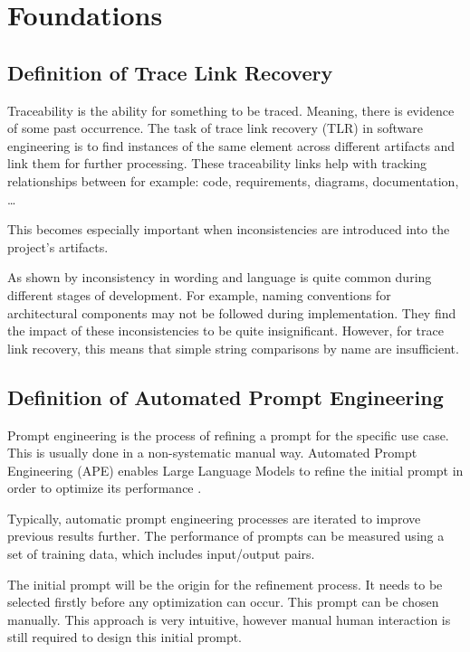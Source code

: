 \chapter{Foundations}

\section{Definition of Trace Link Recovery}
Traceability is the ability for something to be traced. Meaning, there is evidence of some past occurrence. %
The task of trace link recovery (TLR) in software engineering is to find instances of the same element across different artifacts and link them for further processing. These traceability links help with tracking relationships between for example: code, requirements, diagrams, documentation, \dots

This becomes especially important when inconsistencies are introduced into the project's artifacts. 

As shown by  inconsistency in wording and language is quite common during different stages of development. For example, naming conventions for architectural components may not be followed during implementation. They find the impact of these inconsistencies to be quite insignificant. However, for trace link recovery, this means that simple string comparisons by name are insufficient.



\section{Definition of Automated Prompt Engineering}
Prompt engineering is the process of refining a prompt for the specific use case. This is usually done in a non-systematic manual way. Automated Prompt Engineering (APE) enables Large Language Models to refine the initial prompt in order to optimize its performance \cite{zadenoori2025AutomaticPrompt}. 

Typically, automatic prompt engineering processes are iterated to improve previous results further\citeiterative . The performance of prompts can be measured using a set of training data, which includes input/output pairs. 

The initial prompt will be the origin for the refinement process. It needs to be selected firstly before any optimization can occur. This prompt can be chosen manually. This approach is very intuitive, however manual human interaction is still required to design this initial prompt. 

